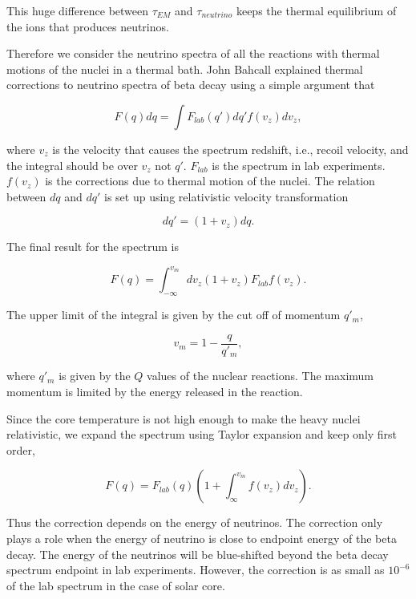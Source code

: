 \documentclass[%
 aip,
 jmp,%
 amsmath,amssymb,
 reprint,%
]{revtex4-1}
\begin{document}
This huge difference between $\tau_{EM}$ and $\tau_{neutrino}$ keeps the thermal equilibrium of the ions that produces neutrinos.

Therefore we consider the neutrino spectra of all the reactions with thermal motions of the nuclei in a thermal bath. John Bahcall explained thermal corrections to neutrino spectra of beta decay using a simple argument that\cite{Bahcall1991}

\begin{equation}
F(q) dq = \int F_{lab}(q') dq' f(v_z) dv_z,
\end{equation}

where $v_z$ is the velocity that causes the spectrum redshift, i.e., recoil velocity, and the integral should be over $v_z$ not $q'$. $F_{lab}$ is the spectrum in lab experiments. $f(v_z)$ is the corrections due to thermal motion of the nuclei. The relation between $dq$ and $dq'$ is set up using relativistic velocity transformation

\begin{equation}
dq' = ( 1+ v_z ) dq.
\end{equation}

The final result for the spectrum is

\begin{equation}
F(q) = \int_{-\infty}^{v_m} d v_z (1+v_z) F_{lab}f(v_z).
\end{equation}

The upper limit of the integral is given by the cut off of momentum $q'_m$,

\begin{equation}
v_m = 1 - \frac{q}{q'_m},
\end{equation}

where $q'_m$ is given by the $Q$ values of the nuclear reactions. The maximum momentum is limited by the energy released in the reaction.

Since the core temperature is not high enough to make the heavy nuclei relativistic, we expand the spectrum using Taylor expansion and keep only first order,

\begin{equation}
F(q) = F_{lab}(q) (1 + \int_{\infty}^{v_m} f(v_z) dv_z).
\end{equation}

Thus the correction depends on the energy of neutrinos. The correction only plays a role when the energy of neutrino is close to endpoint energy of the beta decay. The energy of the neutrinos will be blue-shifted beyond the beta decay spectrum endpoint in lab experiments. However, the correction is as small as $10^{-6}$ of the lab spectrum in the case of solar core.\cite{Bahcall1991}
\end{document}
